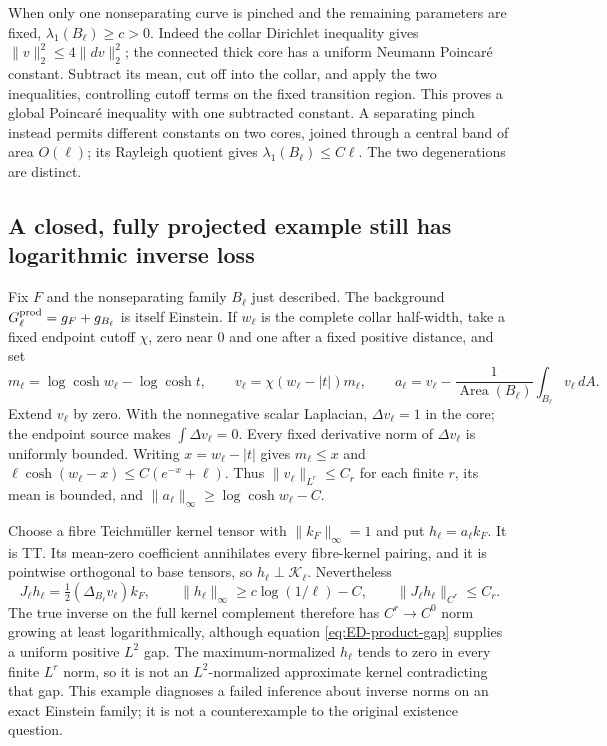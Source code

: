 \documentclass[a4paper,11pt]{article}
\numberwithin{equation}{section}
\theoremstyle{definition}
\begin{document}
When only one nonseparating curve is pinched and the remaining parameters
are fixed, $\lambda_1(B_\ell)\ge c>0$.
Indeed the collar Dirichlet inequality gives
$\|v\|_2^2\le4\|dv\|_2^2$; the connected thick core has a uniform Neumann
Poincar\'e constant. Subtract its mean, cut off into the collar, and apply the
two inequalities, controlling cutoff terms on the fixed transition region.
This proves a global Poincar\'e inequality with one subtracted constant.
A separating pinch instead permits different constants on two cores,
joined through a central band of area $O(\ell)$; its Rayleigh quotient gives
$\lambda_1(B_\ell)\le C\ell$. The two degenerations are distinct.

\subsection{A closed, fully projected example still has logarithmic inverse loss}
Fix $F$ and the nonseparating family $B_\ell$ just described.
The background $G_\ell^{\rm prod}=g_F+g_{B_\ell}$ is itself Einstein.
If $w_\ell$ is the complete collar half-width, take a fixed endpoint cutoff
$\chi$, zero near 0 and one after a fixed positive distance, and set
\[
m_\ell=\log\cosh w_\ell-\log\cosh t,\qquad
v_\ell=\chi(w_\ell-|t|)m_\ell,\qquad
a_\ell=v_\ell-\frac1{\operatorname{Area}(B_\ell)}
\int_{B_\ell}v_\ell\,dA.
\]
Extend $v_\ell$ by zero. With the nonnegative scalar Laplacian,
$\Delta v_\ell=1$ in the core; the endpoint source makes
$\int\Delta v_\ell=0$. Every fixed derivative norm of $\Delta v_\ell$
is uniformly bounded. Writing $x=w_\ell-|t|$ gives
$m_\ell\le x$ and
$\ell\cosh(w_\ell-x)\le C(e^{-x}+\ell)$.
Thus $\|v_\ell\|_{L^r}\le C_r$ for each finite $r$, its mean is bounded,
and $\|a_\ell\|_\infty\ge\log\cosh w_\ell-C$.

Choose a fibre Teichm\"uller kernel tensor with $\|k_F\|_\infty=1$ and put
$h_\ell=a_\ell k_F$. It is TT. Its mean-zero coefficient annihilates
every fibre-kernel pairing, and it is pointwise orthogonal to base tensors,
so $h_\ell\perp\mathcal K_\ell$. Nevertheless
\begin{equation}\label{eq:ED-closed-log-loss}
J_\ell h_\ell=\tfrac12(\Delta_{B_\ell}v_\ell)k_F,\qquad
\|h_\ell\|_\infty\ge c\log(1/\ell)-C,\qquad
\|J_\ell h_\ell\|_{C^r}\le C_r.
\end{equation}
The true inverse on the full kernel complement therefore has
$C^r\to C^0$ norm growing at least logarithmically, although
equation \eqref{eq:ED-product-gap} supplies a uniform positive $L^2$ gap.
The maximum-normalized $h_\ell$ tends to zero in every finite $L^r$ norm,
so it is not an $L^2$-normalized approximate kernel contradicting that gap.
This example diagnoses a failed inference about inverse norms on an exact
Einstein family; it is not a counterexample to the original existence question.
\end{document}
